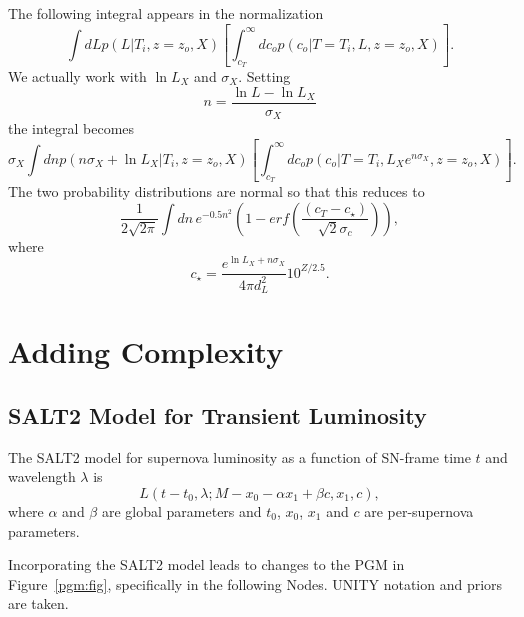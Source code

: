 \documentclass[preprint,3p]{elsarticle}
\begin{document}
The following integral appears in the normalization
\begin{equation}
\int dL p(L|T_i, z=z_o, X)  \left[\int_{c_T}^{\infty} dc_o  p(c_o | T=T_i, L, z=z_o, X)\right].
\end{equation}
We actually work with $\ln{L_X}$ and $\sigma_X$.  Setting
\begin{equation}
n=\frac{\ln{L}-\ln{L_X}}{\sigma_X}
\end{equation}
the integral becomes
 \begin{equation}
\sigma_X \int dn p(n\sigma_X + \ln{L_X} |T_i, z=z_o, X)  \left[\int_{c_T}^{\infty} dc_o  p(c_o | T=T_i, L_Xe^{n\sigma_X}, z=z_o, X)\right].
\end{equation}
The two probability distributions are normal so that this reduces to
 \begin{equation}
\frac{1}{2\sqrt{2\pi}} \int dn\, e^{-0.5n^2} \left(1-erf\left(\frac{(c_T - c_\star)}{\sqrt{2}\sigma_c}\right)\right),
\end{equation}
where
\begin{equation}
c_\star = \frac{e^{\ln{L_X}+n\sigma_X}}{4\pi d_L^2}10^{Z/2.5}.
\end{equation}

\section{Adding Complexity}
\subsection{SALT2 Model for Transient Luminosity}
The SALT2 model for supernova luminosity as a function of SN-frame time $t$  and wavelength $\lambda$ is
\begin{equation}
L(t-t_0, \lambda; M-x_0-\alpha x_1 + \beta c, x_1, c),
\label{SALTL:eqn}
\end{equation}
where $\alpha$ and $\beta$ are global parameters and $t_0$, $x_0$, $x_1$ and $c$ are per-supernova parameters.

Incorporating the SALT2 model leads to changes to the PGM in Figure~\ref{pgm:fig}, specifically in the following Nodes.
UNITY notation and priors are taken.
\end{document}
